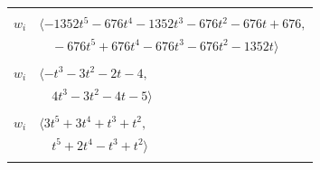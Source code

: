\documentclass[11pt]{article}
\begin{document}
\begin{longtable}{@{}ll@{}}
\addlinespace[2pt]
\multicolumn{2}{@{}p{0.97\textwidth}@{}}{$i=25$, $D_i=676$, $\rho_{ij}$: $6{:}1, \allowbreak 13{:}1, \allowbreak 14{:}1, \allowbreak 16{:}1, \allowbreak 17{:}2, \allowbreak 21{:}2, \allowbreak 24{:}1, \allowbreak 26{:}1$}\\
$w_i$ & $\langle -1352t^{5}-676t^{4}-1352t^{3}-676t^{2}-676t+676,$\\
 & $\quad -676t^{5}+676t^{4}-676t^{3}-676t^{2}-1352t\rangle$\\
\addlinespace[2pt]
\multicolumn{2}{@{}p{0.97\textwidth}@{}}{$i=26$, $D_i=1$, $\rho_{ij}$: $0{:}1, \allowbreak 4{:}2, \allowbreak 9{:}1, \allowbreak 15{:}1, \allowbreak 25{:}2$}\\
$w_i$ & $\langle -t^{3}-3t^{2}-2t-4,$\\
 & $\quad 4t^{3}-3t^{2}-4t-5\rangle$\\
\addlinespace[2pt]
\multicolumn{2}{@{}p{0.97\textwidth}@{}}{$i=27$, $D_i=1$, $\rho_{ij}$: $0{:}1, \allowbreak 4{:}1, \allowbreak 8{:}1, \allowbreak 9{:}1, \allowbreak 15{:}2, \allowbreak 16{:}1, \allowbreak 20{:}2$}\\
$w_i$ & $\langle 3t^{5}+3t^{4}+t^{3}+t^{2},$\\
 & $\quad t^{5}+2t^{4}-t^{3}+t^{2}\rangle$\\
\addlinespace[2pt]
\end{longtable}
\endgroup
\end{document}

